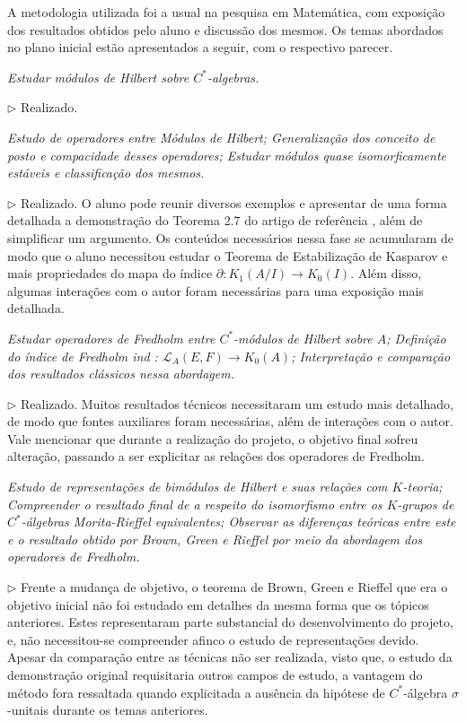 \documentclass[11pt,a4paper]{amsart}
\begin{document}
A metodologia utilizada foi a usual na pesquisa em Matemática, com exposição dos resultados obtidos pelo aluno e discussão dos mesmos. Os temas abordados no plano inicial estão apresentados a seguir, com o respectivo parecer.
\begin{itroman}
	\item \textit{Estudar módulos de Hilbert sobre $C^*$-algebras.} 
	\item[] $\triangleright$ Realizado.
	\item \textit{Estudo de operadores entre Módulos de Hilbert; Generalização dos conceito de posto e compacidade desses operadores; Estudar módulos quase isomorficamente estáveis e classificação dos mesmos.}
	\item[]$\triangleright$ Realizado. O aluno pode reunir diversos exemplos e apresentar de uma forma detalhada a demonstração do Teorema 2.7 do artigo de referência \cite{exel7fredholm}, além de simplificar um argumento. Os conteúdos necessários nessa fase se acumularam de modo que o aluno necessitou estudar o Teorema de Estabilização de Kasparov \cite{kasparov1980stinespring} e mais propriedades do mapa do índice $\partial : K_1(A/I)\longrightarrow K_0(I)$. Além disso, algumas interações com o autor foram necessárias para uma exposição mais detalhada.

  \item \textit{Estudar operadores de Fredholm entre $C^*$-módulos de Hilbert sobre $A$; Definição do índice de Fredholm ind : $\mathcal{L}_A(E, F) \longrightarrow K_0(A)$; Interpretação e comparação dos resultados clássicos nessa abordagem.}
	\item[] $\triangleright$ Realizado. Muitos resultados técnicos necessitaram um estudo mais detalhado, de modo que fontes auxiliares foram necessárias, além de interações com o autor. Vale mencionar que durante a realização do projeto, o objetivo final sofreu alteração, passando a ser explicitar as relações dos operadores de Fredholm.

  \item \textit{Estudo de representações de bimódulos de Hilbert e suas relações com $K$-teoria; Compreender o resultado final de \cite{exel7fredholm} a respeito do isomorfismo entre os $K$-grupos de $C^*$-álgebras Morita-Rieffel equivalentes; Observar as diferenças teóricas entre este e o resultado obtido por Brown, Green e Rieffel por meio da abordagem dos operadores de Fredholm.}
	\item[] $\triangleright$ Frente a mudança de objetivo, o teorema de Brown, Green e Rieffel que era o objetivo inicial não foi estudado em detalhes da mesma forma que os tópicos anteriores. Estes representaram parte substancial do desenvolvimento do projeto, e, não necessitou-se compreender afinco o estudo de representações devido. Apesar da comparação entre as técnicas não ser realizada, visto que, o estudo da demonstração original requisitaria outros campos de estudo, a vantagem do método fora ressaltada quando explicitada a ausência da hipótese de $C^*$-álgebra $\sigma$-unitais durante os temas anteriores.


\end{itroman}
\end{document}
